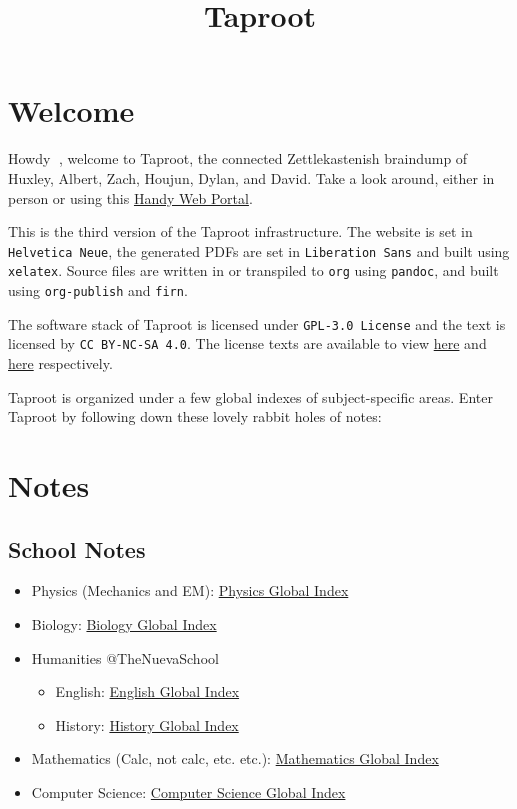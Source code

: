 \documentclass[letterpaper]{article}
\date{}
\title{Taproot}
\begin{document}
\section{Welcome}
\label{sec:org5762b2e}
Howdy 👋, welcome to Taproot, the connected Zettlekastenish braindump of Huxley, Albert, Zach, Houjun, Dylan, and David. Take a look around, either in person or using this \href{https://taproot3.sanity.gq}{Handy Web Portal}.

This is the third version of the Taproot infrastructure. The website is set in \texttt{Helvetica Neue}, the generated PDFs are set in \texttt{Liberation Sans} and built using \texttt{xelatex}. Source files are written in or transpiled to \texttt{org} using \texttt{pandoc}, and built using \texttt{org-publish} and \texttt{firn}.

The software stack of Taproot is licensed under \texttt{GPL-3.0 License} and the text is licensed by \texttt{CC BY-NC-SA 4.0}. The license texts are available to view \href{https://www.gnu.org/licenses/gpl-3.0.en.html}{here} and \href{https://creativecommons.org/licenses/by-nc-sa/2.0/}{here} respectively.

Taproot is organized under a few global indexes of subject-specific areas. Enter Taproot by following down these lovely rabbit holes of notes:

\section{Notes}
\label{sec:org77cfc4f}

\subsection{School Notes}
\label{sec:org0ae4b40}
\begin{itemize}
\item Physics (Mechanics and EM): \href{physics/index.org}{Physics Global Index}
\item Biology: \href{biology/index.org}{Biology Global Index}
\item Humanities @TheNuevaSchool
\begin{itemize}
\item English: \href{english/index.org}{English Global Index}
\item History: \href{history/index.org}{History Global Index}
\end{itemize}
\item Mathematics (Calc, not calc, etc. etc.): \href{mathematics/index.org}{Mathematics Global Index}
\item Computer Science: \href{cs/index.org}{Computer Science Global Index}
\end{itemize}
\end{document}
